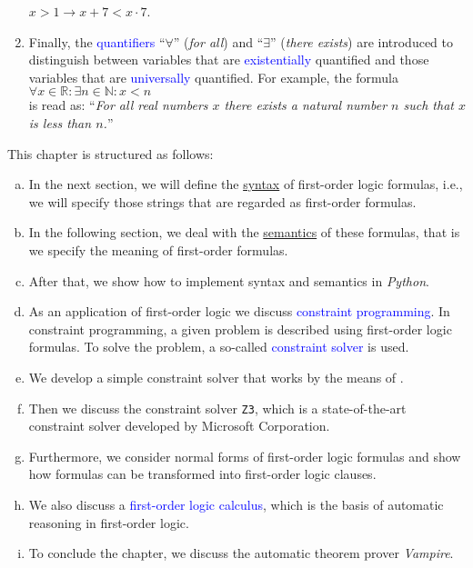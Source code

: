 \begin{enumerate}
      $x > 1 \rightarrow x + 7 < x \cdot  7$.
\item Finally, the \textcolor{blue}{quantifiers} ``$\forall$'' (\emph{for all}) and
      ``$\exists$'' (\emph{there exists}) are introduced to distinguish between variables that are
      \textcolor{blue}{existentially} quantified and those variables that are \textcolor{blue}{universally}
      quantified.  For example, the formula 
      \\[0.2cm]
      \hspace*{1.3cm}
      $\forall x \in \mathbb{R}: \exists n \in \mathbb{N}: x < n$
      \\[0.2cm]
      is read as: ``\textsl{For all real numbers $x$ there exists a natural number $n$ such that $x$ is less
        than $n$.}''
\end{enumerate}
This chapter is structured as follows:
\begin{enumerate}[(a)]
\item In the next section, we will define the \href{https://en.wikipedia.org/wiki/Syntax}{syntax} of
      first-order logic formulas, i.e., we will specify those strings that are regarded as first-order
      formulas.
\item In the following section, we deal with the
      \href{https://en.wikipedia.org/wiki/Semantics}{semantics} of these formulas, that is we specify the 
      meaning of first-order formulas.
\item After that, we show how to implement syntax and semantics in \textsl{Python}.
\item As an application of first-order logic we discuss \textcolor{blue}{constraint programming}.
      In constraint programming, a given problem is described using first-order logic formulas.
      To solve the problem, a so-called \textcolor{blue}{constraint solver} is used.
\item We develop a simple constraint solver that works by the means of .
\item Then we discuss the constraint solver \texttt{Z3}, which is a state-of-the-art constraint solver
      developed by Microsoft Corporation.
\item Furthermore, we consider normal forms of first-order logic formulas and show how formulas
      can be transformed into first-order logic clauses.
\item We also discuss a \textcolor{blue}{first-order logic calculus}, which is the basis
      of automatic reasoning in first-order logic.
\item To conclude the chapter, we discuss the automatic theorem prover \textsl{Vampire}.
\end{enumerate}

